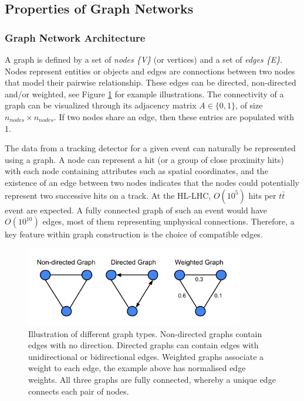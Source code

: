 \subsection{Properties of Graph Networks}
\label{properties-graph-networks}

\subsubsection{Graph Network Architecture}

A graph is defined by a set of \textit{nodes \{V\}} (or vertices) and a set of \textit{edges \{E\}}. Nodes represent entities or objects and edges are connections between two nodes that model their pairwise relationship. These edges can be directed, non-directed and/or weighted, see Figure \ref{fig:graph-architecture-example} for example illustrations. The connectivity of a graph can be visualized through its adjacency matrix $A \in \{0, 1\}$, of size $n_{nodes} \times n_{nodes}$. If two nodes share an edge, then these entries are populated with 1. 

The data from a tracking detector for a given event can naturally be represented using a graph. A node can represent a hit (or a group of close proximity hits) with each node containing attributes such as spatial coordinates, and the existence of an edge between two nodes indicates that the nodes could potentially represent two successive hits on a track. At the HL-LHC, $O(10^{5})$ hits per $t\bar{t}$ event are expected. A fully connected graph of such an event would have $O(10^{10})$ edges, most of them representing unphysical connections. Therefore, a key feature within graph construction is the choice of compatible edges. 

\begin{figure}[!htbp]
  \centering
  \includegraphics[width=0.85\textwidth]{images/3-track-reconstruction/Graphs.png}
  \caption{
    Illustration of different graph types. Non-directed graphs contain edges with no direction. Directed graphs can contain edges with unidirectional or bidirectional edges. Weighted graphs associate a weight to each edge, the example above has normalised edge weights. All three graphs are fully connected, whereby a unique edge connects each pair of nodes.
  }
  \label{fig:graph-architecture-example}
\end{figure}


